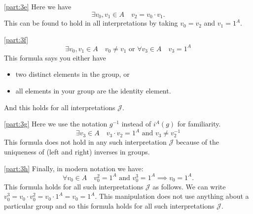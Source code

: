 \documentclass[boxes,pages,color=CornflowerBlue]{homework}
\begin{document}
\begin{solution}
    \ref{part:3e}
    Here we have
    \begin{equation*}
        \exists v_0, v_1 \in A \quad v_2 = v_0 \cdot v_1.
    \end{equation*}
    This can be found to hold in all interpretations by taking $v_0 = v_2$ and $v_1 = 1^A$.

    \ref{part:3f}
    \begin{equation*}
        \exists v_0, v_1 \in A \quad v_0 \neq v_1 \text{ or } \forall v_3 \in A \quad v_3 = 1^A
    \end{equation*}
    This formula says you either have
    \begin{itemize}[topsep=6pt,itemsep=0pt,partopsep=4pt,parsep=2pt]
        \item two distinct elements in the group, or
        \item all elements in your group are the identity element.
    \end{itemize}
    And this holds for all interpretations $\mathcal{J}$.

    \ref{part:3g}
    Here we use the notation $g^{-1}$ instead of $i^A(g)$ for familiarity.
    \begin{equation*}
        \exists v_3 \in A \quad v_3\cdot v_2 = 1^A \text{ and } v_3 \neq v_2^{-1}
    \end{equation*}
    This formula does not hold in any such interpretation $\mathcal{J}$ because of the uniqueness of (left and right) inverses in groups.

    \ref{part:3h}
    Finally, in modern notation we have:
    \begin{equation*}
        \forall v_0 \in A \quad v_0^2 = 1^A \text{ and } v_0^3 = 1^A \implies v_0 = 1^A.
    \end{equation*}
    This formula holds for all such interpretations $\mathcal{J}$ as follows.
    We can write $v_0^3 = v_0\cdot v_0^2 = v_0 \cdot 1^A = v_0 = 1^A$.
    This manipulation does not use anything about a particular group and so this formula holds for all such interpretations $\mathcal{J}$.
\end{solution}
\end{document}
